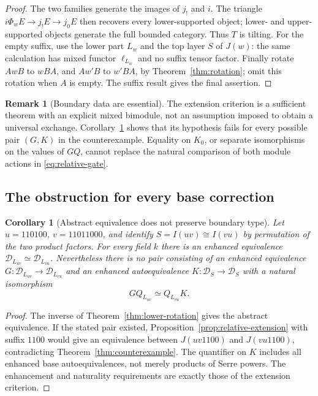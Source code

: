 \documentclass[11pt]{article}
\newtheorem{corollary}[theorem]{Corollary}
\theoremstyle{definition}
\newtheorem{remark}[theorem]{Remark}
\begin{document}
\begin{proof}
The two families generate the images of $j_!$ and $i$. The triangle
$i\Phi_wE\to j_!E\to j_0E$ then recovers every lower-supported
object; lower- and upper-supported objects generate the full
bounded category. Thus $T$ is tilting. For the empty suffix, use
the lower part $L_w$ and the top layer $S$ of $J(w)$: the same
calculation has mixed functor $\ell_{L_w}$ and no suffix tensor
factor. Finally rotate $AwB$ to $wBA$, and $Aw'B$ to $w'BA$,
by Theorem~\ref{thm:rotation}; omit this rotation when $A$ is empty.
The suffix result gives the final assertion.
\end{proof}

\begin{remark}[Boundary data are essential]
The extension criterion is a sufficient theorem with an explicit
mixed bimodule, not an assumption imposed to obtain a universal
exchange. Corollary~\ref{cor:absolute-boundary-obstruction}
shows that its hypothesis fails for every possible pair $(G,K)$
in the counterexample. Equality on $K_0$, or separate isomorphisms
on the values of $GQ$, cannot replace the natural comparison of
both module actions in \eqref{eq:relative-gate}.
\end{remark}


\subsection{The obstruction for every base correction}
\begin{corollary}[Abstract equivalence does not preserve boundary type]
\label{cor:absolute-boundary-obstruction}
Let $u=110100$, $v=11011000$, and identify
$S=I(uv)\cong I(vu)$ by permutation of the two product factors.
For every field $k$ there is an enhanced equivalence
$\mathcal D_{L_{uv}}\simeq\mathcal D_{L_{vu}}$.
Nevertheless there is no pair consisting of an enhanced equivalence
$G:\mathcal D_{L_{uv}}\to\mathcal D_{L_{vu}}$ and an enhanced
autoequivalence $K:\mathcal D_S\to\mathcal D_S$ with a natural isomorphism
\[
 GQ_{L_{uv}}\simeq Q_{L_{vu}}K.
\]
\end{corollary}
\begin{proof}
The inverse of Theorem~\ref{thm:lower-rotation} gives the abstract
equivalence. If the stated pair existed, Proposition~\ref{prop:relative-extension}
with suffix $1100$ would give an equivalence between $J(uv1100)$
and $J(vu1100)$, contradicting Theorem~\ref{thm:counterexample}.
The quantifier on $K$ includes all enhanced base autoequivalences,
not merely products of Serre powers. The enhancement and naturality
requirements are exactly those of the extension criterion.
\end{proof}
\end{document}
